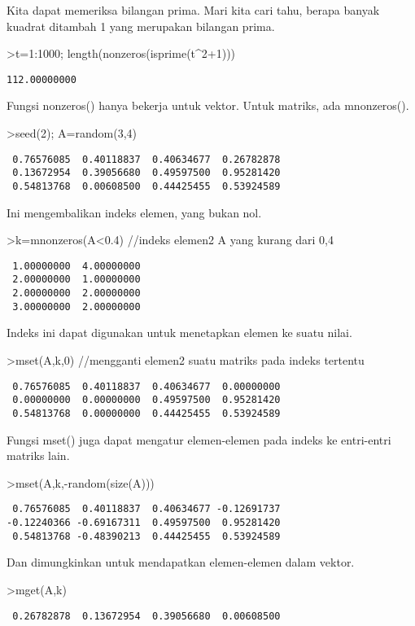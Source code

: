 \documentclass[
]{book}
\begin{document}
Kita dapat memeriksa bilangan prima. Mari kita cari tahu, berapa banyak kuadrat ditambah 1 yang merupakan bilangan prima.

\textgreater t=1:1000; length(nonzeros(isprime(t\^{}2+1)))

\begin{verbatim}
112.00000000 
\end{verbatim}

Fungsi nonzeros() hanya bekerja untuk vektor. Untuk matriks, ada mnonzeros().

\textgreater seed(2); A=random(3,4)

\begin{verbatim}
 0.76576085  0.40118837  0.40634677  0.26782878 
 0.13672954  0.39056680  0.49597500  0.95281420 
 0.54813768  0.00608500  0.44425455  0.53924589 
\end{verbatim}

Ini mengembalikan indeks elemen, yang bukan nol.

\textgreater k=mnonzeros(A\textless0.4) //indeks elemen2 A yang kurang dari 0,4

\begin{verbatim}
 1.00000000  4.00000000 
 2.00000000  1.00000000 
 2.00000000  2.00000000 
 3.00000000  2.00000000 
\end{verbatim}

Indeks ini dapat digunakan untuk menetapkan elemen ke suatu nilai.

\textgreater mset(A,k,0) //mengganti elemen2 suatu matriks pada indeks tertentu

\begin{verbatim}
 0.76576085  0.40118837  0.40634677  0.00000000 
 0.00000000  0.00000000  0.49597500  0.95281420 
 0.54813768  0.00000000  0.44425455  0.53924589 
\end{verbatim}

Fungsi mset() juga dapat mengatur elemen-elemen pada indeks ke entri-entri matriks lain.

\textgreater mset(A,k,-random(size(A)))

\begin{verbatim}
 0.76576085  0.40118837  0.40634677 -0.12691737 
-0.12240366 -0.69167311  0.49597500  0.95281420 
 0.54813768 -0.48390213  0.44425455  0.53924589 
\end{verbatim}

Dan dimungkinkan untuk mendapatkan elemen-elemen dalam vektor.

\textgreater mget(A,k)

\begin{verbatim}
 0.26782878  0.13672954  0.39056680  0.00608500 
\end{verbatim}
\end{document}
